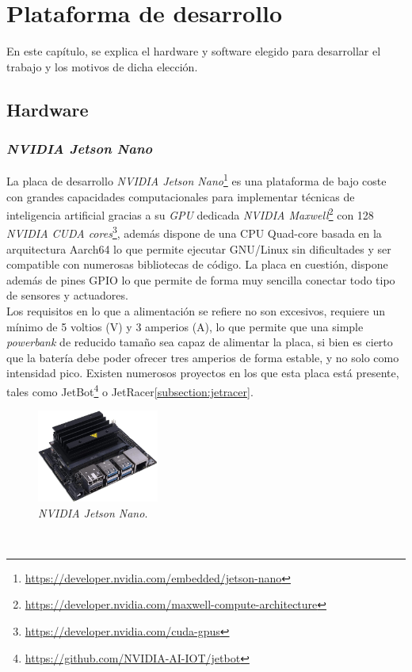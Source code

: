 \chapter{Plataforma de desarrollo}
\label{cap:capitulo3}

En este capítulo, se explica el hardware y software elegido para desarrollar el trabajo y los motivos de dicha elección.

\section{Hardware}
\subsection{\textit{NVIDIA Jetson Nano}}
\label{subsection:jetsonnano}
La placa de desarrollo \textit{NVIDIA Jetson Nano}\footnote{\url{https://developer.nvidia.com/embedded/jetson-nano}} es una plataforma de bajo coste con grandes capacidades computacionales para implementar técnicas de inteligencia artificial gracias a su \textit{GPU} dedicada \textit{NVIDIA Maxwell}\footnote{\url{https://developer.nvidia.com/maxwell-compute-architecture}} con 128 \textit{NVIDIA CUDA cores}\footnote{\url{https://developer.nvidia.com/cuda-gpus}}, además dispone de una CPU Quad-core basada en la arquitectura Aarch64 lo que permite ejecutar GNU/Linux sin dificultades y ser compatible con numerosas bibliotecas de código. La placa en cuestión, dispone además de pines GPIO lo que permite de forma muy sencilla conectar todo tipo de sensores y actuadores.\\

Los requisitos en lo que a alimentación se refiere no son excesivos, requiere un mínimo de 5 voltios (V) y 3 amperios (A), lo que permite que una simple \textit{powerbank} de reducido tamaño sea capaz de alimentar la placa, si bien es cierto que la batería debe poder ofrecer tres amperios de forma estable, y no solo como intensidad pico. Existen numerosos proyectos en los que esta placa está presente, tales como JetBot\footnote{\url{https://github.com/NVIDIA-AI-IOT/jetbot}} o JetRacer\ref{subsection:jetracer}.\\

\begin{figure} [h!]
	\begin{center}
		\includegraphics[width=4cm]{figs/jetsonnano}
	\end{center}
	\caption{\textit{NVIDIA Jetson Nano}.}
	\label{fig:jetsonnano}
\end{figure}\

